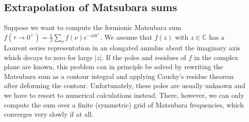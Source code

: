 \documentclass{SciPost}
\begin{document}
\begin{appendix}

\section{Extrapolation of Matsubara sums}
\label{app:extrapolation}

Suppose we want to compute the fermionic Matsubara sum $f(\tau \to 0^+) = \frac{1}{\beta} \sum_{\nu} f(\nu) e^{-i\nu0^{+}}$. We assume that $f(z)$ with $z \in \mathbb{C}$ has a Laurent series representation in an elongated annulus about the imaginary axis which decays to zero for large $|z|$. If the poles and residues of $f$ in the complex plane are known, this problem can in principle be solved by rewriting the Matsubara sum as a contour integral and applying Cauchy's residue theorem after deforming the contour. Unfortunately, these poles are usually unknown and we have to resort to numerical calculations instead. There, however, we can only compute the sum over a finite (symmetric) grid of Matsubara frequencies, which converges very slowly if at all.


\end{appendix}
\end{document}
